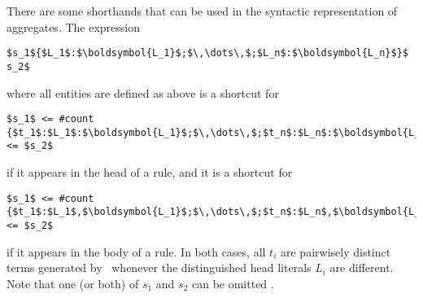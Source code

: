 There are some shorthands that can be used in the syntactic representation of aggregates.
%
The expression
%
\begin{lstlisting}[numbers=none,mathescape]
$s_1${$L_1$:$\boldsymbol{L_1}$;$\,\dots\,$;$L_n$:$\boldsymbol{L_n}$}$ s_2$
\end{lstlisting}
%
where all entities are defined as above 
is a shortcut for
%
\begin{lstlisting}[numbers=none,mathescape]
$s_1$ <= #count {$t_1$:$L_1$:$\boldsymbol{L_1}$;$\,\dots\,$;$t_n$:$L_n$:$\boldsymbol{L_n}$} <= $s_2$
\end{lstlisting}
%
if it appears in the head of a rule, and
it is a shortcut for
%
\begin{lstlisting}[numbers=none,mathescape]
$s_1$ <= #count {$t_1$:$L_1$,$\boldsymbol{L_1}$;$\,\dots\,$;$t_n$:$L_n$,$\boldsymbol{L_n}$} <= $s_2$
\end{lstlisting}
%
if it appears in the body of a rule.
In both cases, all $t_i$ are pairwisely distinct terms generated by \gringo\
whenever the distinguished head literals $L_i$ are different.
%
Note that one (or both) of $s_1$ and $s_2$ can be omitted .

